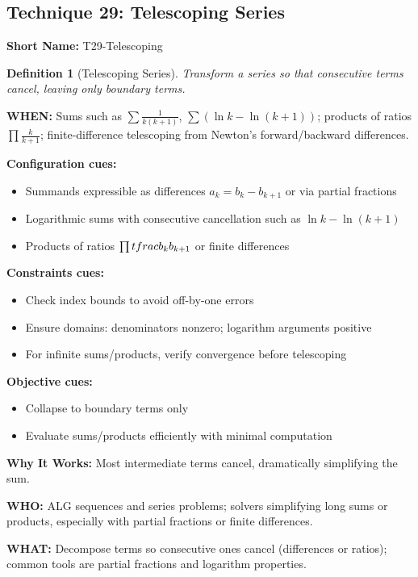 \documentclass[12pt]{article}
\newtheorem{definition}{Definition}[section]
\begin{document}
\subsection{Technique 29: Telescoping Series}
\textbf{Short Name:} T29-Telescoping

\begin{definition}[Telescoping Series]
Transform a series so that consecutive terms cancel, leaving only boundary terms.
\end{definition}

\textbf{WHEN:} Sums such as \(\sum \tfrac{1}{k(k+1)}\), \(\sum (\ln k - \ln(k+1))\); products of ratios \(\prod \tfrac{k}{k+1}\); finite-difference telescoping from Newton's forward/backward differences.

\textbf{Configuration cues:}
\begin{itemize}
    \item Summands expressible as differences \(a_k=b_k-b_{k+1}\) or via partial fractions
    \item Logarithmic sums with consecutive cancellation such as \(\ln k - \ln(k+1)\)
    \item Products of ratios \(\prod \\tfrac{b_k}{b_{k+1}}\) or finite differences
\end{itemize}

\textbf{Constraints cues:}
\begin{itemize}
    \item Check index bounds to avoid off-by-one errors
    \item Ensure domains: denominators nonzero; logarithm arguments positive
    \item For infinite sums/products, verify convergence before telescoping
\end{itemize}

\textbf{Objective cues:}
\begin{itemize}
    \item Collapse to boundary terms only
    \item Evaluate sums/products efficiently with minimal computation
\end{itemize}

\textbf{Why It Works:} Most intermediate terms cancel, dramatically simplifying the sum.

\textbf{WHO:} ALG sequences and series problems; solvers simplifying long sums or products, especially with partial fractions or finite differences.

\textbf{WHAT:} Decompose terms so consecutive ones cancel (differences or ratios); common tools are partial fractions and logarithm properties.
\end{document}
